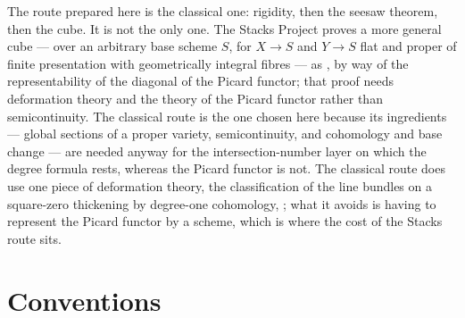 \begin{remark}\label{rem:cube-two-routes}
The route prepared here is the classical one: rigidity, then the seesaw
theorem, then the cube.  It is not the only one.  The Stacks Project proves a
more general cube --- over an arbitrary base scheme $S$, for $X\to S$ and
$Y\to S$ flat and proper of finite presentation with geometrically integral
fibres --- as , by way of the representability of the
diagonal of the Picard functor; that proof needs deformation theory and the
theory of the Picard functor rather than semicontinuity.  The classical route
is the one chosen here because its ingredients --- global sections of a proper
variety, semicontinuity, and cohomology and base change --- are needed anyway
for the intersection-number layer on which the degree formula
 rests, whereas the Picard functor is not.  The
classical route does use one piece of deformation theory, the classification of
the line bundles on a square-zero thickening by degree-one cohomology,
; what it avoids is having to represent the
Picard functor by a scheme, which is where the cost of the Stacks route sits.
\end{remark}


\section{Conventions}\label{sec:cube-conventions}

